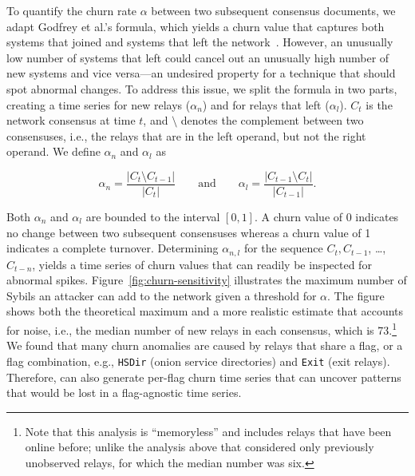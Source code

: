 To quantify the churn rate $\alpha$ between two subsequent consensus documents,
we adapt Godfrey et al.'s formula, which yields a churn value that captures
both systems that joined and systems that left the
network~\cite[\S~2.1]{Godfrey2006a}.  However, an unusually low number of
systems that left could cancel out an unusually high number of new systems and
vice versa---an undesired property for a technique that should spot abnormal
changes.  To address this issue, we split the formula in two parts, creating a
time series for new relays ($\alpha_{n}$) and for relays that left
($\alpha_{l}$).  $C_{t}$ is the network consensus at time $t$, and $\setminus$
denotes the complement between two consensuses, i.e., the relays that are in
the left operand, but not the right operand.  We define $\alpha_{n}$ and
$\alpha_{l}$ as

\begin{equation}
\alpha_{n} = \frac{\lvert C_{t} \setminus C_{t-1} \rvert}
{\lvert C_{t} \rvert}
\qquad\text{and}\qquad
\alpha_{l} = \frac{\lvert C_{t-1} \setminus C_{t} \rvert}
{\lvert C_{t-1} \rvert}.
\end{equation}

Both $\alpha_{n}$ and $\alpha_{l}$ are bounded to the interval $[0, 1]$.  A
churn value of 0 indicates no change between two subsequent consensuses whereas
a churn value of 1 indicates a complete turnover.  Determining $\alpha_{n,l}$
for the sequence $C_{t}, C_{t-1}$, \ldots, $C_{t-n}$, yields a time series of
churn values that can readily be inspected for abnormal spikes.
Figure~\ref{fig:churn-sensitivity} illustrates the maximum number of Sybils an
attacker can add to the network given a threshold for $\alpha$.  The figure
shows both the theoretical maximum and a more realistic estimate that accounts
for noise, i.e., the median number of new relays in each consensus, which is
73.\footnote{Note that this analysis is ``memoryless'' and includes relays that
have been online before; unlike the analysis above that considered only
previously unobserved relays, for which the median number was six.} We found
that many churn anomalies are caused by relays that share a flag, or a flag
combination, e.g., \texttt{HSDir} (onion service directories) and \texttt{Exit}
(exit relays).  Therefore, \sys can also generate per-flag churn time series
that can uncover patterns that would be lost in a flag-agnostic time series.

